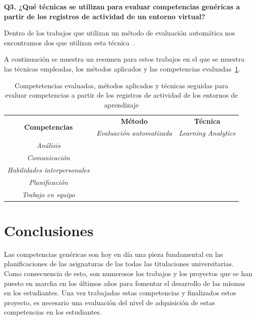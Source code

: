 \bigskip
\textbf{Q3. ¿Qué técnicas se utilizan para evaluar competencias genéricas a partir de los registros de actividad de un entorno virtual?}

Dentro de los trabajos que utilizan un método de evaluación automática nos encontramos dos que utilizan esta técnica~\cite{rayon2014web,fidalgo:2015}. 

A continuación se muestra un resumen para estos trabajos en el que se muestra las técnicas empleadas, los métodos aplicados y las competencias evaluadas~\ref{tab:CompetenciasMetodosTecnicas}.

\begin{table}
  \begin{center}
  \begin{tabular}{| c | c | c |}
    \hline
     \multirow{2}{*}{\textbf{Competencias}} & \textbf{Método} & \textbf{Técnica} \\
    \cline{2-3}
     & \emph{Evaluación automatizada} & \emph{Learning Analytics}\\
    \hline
    \hline
    \emph{Análisis} & \multicolumn{2}{c|}{ \cite{rayon2014web} }  \\
    \hline
    \emph{Comunicación} & \multicolumn{2}{c|}{ \cite{rayon2014web} } \\
    \hline
    \emph{Habilidades interpersonales} & \multicolumn{2}{c|}{ \cite{rayon2014web} } \\
    \hline
    \emph{Planificación} & \multicolumn{2}{c|}{ \cite{rayon2014web} } \\
    \hline
    \emph{Trabajo en equipo} & \multicolumn{2}{c|}{ \cite{rayon2014web,fidalgo:2015} } \\
    \hline
  \end{tabular}
\end{center}
\caption{Competetencias evaluadas, métodos aplicados y técnicas seguidas para evaluar competencias a partir de los registros de actividad de los entornos de aprendizaje}
\label{tab:CompetenciasMetodosTecnicas}
\end{table}



\section{Conclusiones}

Las competencias genéricas son hoy en día una pieza fundamental en las planificaciones de las asignaturas de las todas las titulaciones universitarias. Como consecuencia de esto, son numerosos los trabajos y los proyectos que se han puesto en marcha en los últimos años para fomentar el desarrollo de las mismas en los estudiantes. Una vez trabajadas estas competencias y finalizados estos proyecto, es necesario una evaluación del nivel de adquisición de estas competencias en los estudiantes.

